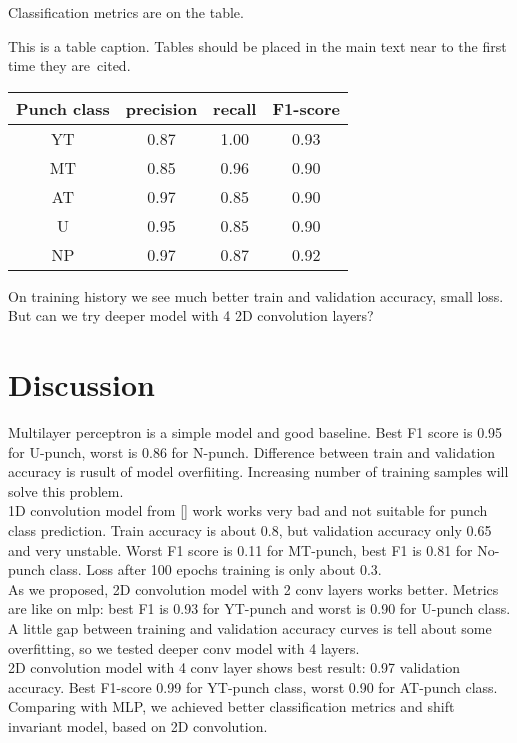 \documentclass[sport,article,submit,moreauthors,pdftex]{Definitions/mdpi}
\begin{document}
Classification metrics are on the table.

\begin{specialtable}[H] 
\caption{This is a table caption. Tables should be placed in the main text near to the first time they are~cited.\label{tab1}}
\begin{tabular}{cccc}
\toprule
\textbf{Punch class}	& \textbf{precision}	& \textbf{recall}	& \textbf{F1-score}\\
\midrule
YT		& 0.87		& 1.00		& 0.93 \\
MT		& 0.85		& 0.96		& 0.90 \\
AT		& 0.97		& 0.85		& 0.90 \\
U		& 0.95		& 0.85		& 0.90 \\
NP		& 0.97		& 0.87		& 0.92 \\
\bottomrule
\end{tabular}
\end{specialtable}

On training history we see much better train and validation accuracy, small loss.
But can we try deeper model with 4 2D convolution layers?

\section{Discussion}
Multilayer perceptron is a simple model and good baseline. Best F1 score is 0.95 for U-punch, worst is 0.86 for N-punch. Difference between train and validation accuracy is rusult of model overfiiting.
Increasing number of training samples will solve this problem.\\
1D convolution model from [] work works very bad and not suitable for punch class prediction. Train accuracy is about 0.8, but validation accuracy only 0.65 and very unstable. Worst F1 score is 0.11 for MT-punch, best F1 is 0.81 for No-punch class. Loss after 100 epochs training is only about 0.3.\\
As we proposed, 2D convolution model with 2 conv layers works better. Metrics are like on mlp: best F1 is 0.93 for YT-punch and worst is 0.90 for U-punch class. A little gap between training and validation accuracy curves is tell about some overfitting, so we tested deeper conv model with 4 layers.\\
2D convolution model with 4 conv layer shows best result: 0.97 validation accuracy. Best F1-score 0.99 for YT-punch class, worst 0.90 for AT-punch class.\\
Comparing with MLP, we achieved better classification metrics and shift invariant model, based on 2D convolution. 
\end{document}
